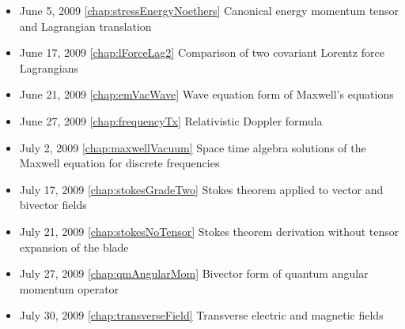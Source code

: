 \begin{itemize}
\item June 5, 2009 \ref{chap:stressEnergyNoethers} Canonical energy momentum tensor and Lagrangian translation

\item June 17, 2009 \ref{chap:lForceLag2} Comparison of two covariant Lorentz force Lagrangians

\item June 21, 2009 \ref{chap:emVacWave} Wave equation form of Maxwell's equations

\item June 27, 2009 \ref{chap:frequencyTx} Relativistic Doppler formula

\item July 2, 2009 \ref{chap:maxwellVacuum} Space time algebra solutions of the Maxwell equation for discrete frequencies

\item July 17, 2009 \ref{chap:stokesGradeTwo} Stokes theorem applied to vector and bivector fields

\item July 21, 2009 \ref{chap:stokesNoTensor} Stokes theorem derivation without tensor expansion of the blade

\item July 27, 2009 \ref{chap:qmAngularMom} Bivector form of quantum angular momentum operator

\item July 30, 2009 \ref{chap:transverseField} Transverse electric and magnetic fields

\end{itemize}
